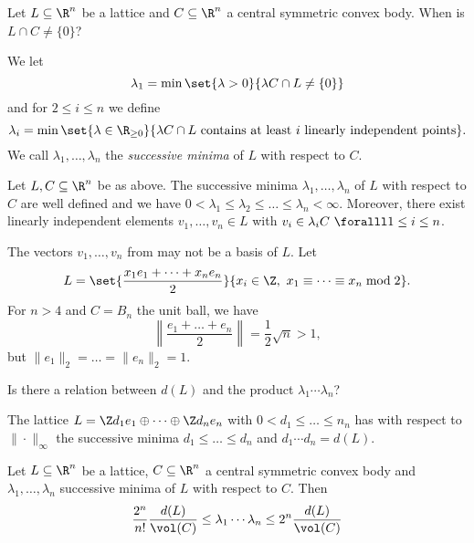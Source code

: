 Let \( L \subseteq \R^n \) be a lattice and \( C \subseteq \R^n \) a central symmetric convex body.
When is \( L \cap C \neq \{0\} \)?


\begin{defn*}
	We let
	\[ \lambda_1 = \min \set{\lambda > 0}{\lambda C \cap L \neq \{0\}} \]
	and for \( 2 \leq i \leq n \) we define
	\[ \lambda_i = \min \set{\lambda \in \R_{\geq 0}}{\lambda C \cap L \ \text{contains at least } i \ \text{linearly independent points}}. \]
	We call \( \lambda_1, \dotsc, \lambda_n \) the \emph{successive minima} of \( L \) with respect to \( C \).
\end{defn*}

\begin{lem}\label{thm:3.10}
	Let \( L, C \subseteq \R^n \) be as above.
	The successive minima \( \lambda_1, \dotsc, \lambda_n \) of \( L \) with respect to \( C \) are well defined and we have \( 0 < \lambda_1 \leq \lambda_2 \leq \dots \leq \lambda_n < \infty \).
	Moreover, there exist linearly independent elements \( v_1, \dotsc, v_n \in L \) with \( v_i \in \lambda_i C\ \foralll 1 \leq i \leq n \).
\end{lem}

\begin{cav*}
	The vectors \( v_1, \dotsc, v_n \) from  may not be a basis of \( L \).
	Let
	\[ L = \set{\frac{x_1 e_1 + \dots + x_n e_n}{2}}{x_i \in \Z,\ x_1 \equiv \dots \equiv x_n \bmod 2}. \]
	For \( n>4 \) and \( C = B_n \) the unit ball, we have
	\[ \left\| \frac{e_1 + \dots + e_n}{2} \right\| = \frac{1}{2} \sqrt{n} > 1, \]
	but \( \|e_1\|_2 = \dots = \|e_n\|_2 = 1 \).
\end{cav*}

\begin{frage*}
	Is there a relation between \( d(L) \) and the product \( \lambda_1 \dotsm \lambda_n \)?
\end{frage*}

\begin{exmp*}
	The lattice \( L = \Z d_1 e_1 \oplus \dots \oplus \Z d_n e_n \) with \( 0 < d_1 \leq \dots \leq n_n \) has with respect to \( \| \cdot \|_\infty \) the successive minima \( d_1 \leq \dots \leq d_n \) and \( d_1 \dotsm d_n = d(L) \).
\end{exmp*}

\begin{thmn}\label{thm:3.11}
	Let \( L \subseteq \R^n \) be a lattice, \( C \subseteq \R^n \) a central symmetric convex body and \( \lambda_1, \dotsc, \lambda_n \) successive minima of \( L \) with respect to \( C \).
	Then
	\[ \frac{2^n}{n!} \frac{d(L)}{\vol(C)} \leq \lambda_1 \dotsm \lambda_n \leq 2^n \frac{d(L)}{\vol(C)} \]
\end{thmn}